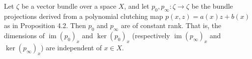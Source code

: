 Let $\zeta$ be a vector bundle over a space $X$, and let $p_0, p_\infty: \zeta \to \zeta$ be the bundle projections derived from a polynomial clutching map $p(x,z) = a(x)z + b(x)$ as in Proposition 4.2. Then $p_0$ and $p_\infty$ are of constant rank. That is, the dimensions of $\operatorname{im}(p_0)_x$ and $\ker(p_0)_x$ (respectively $\operatorname{im}(p_\infty)_x$ and $\ker(p_\infty)_x$) are independent of $x \in X$.
